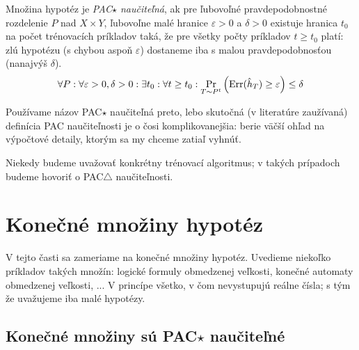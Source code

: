 \begin{definition}
  Množina hypotéz je \emph{PAC$\star$ naučiteľná}, ak pre ľubovoľné pravdepodobnostné
  rozdelenie $P$ nad $X \times Y$, ľubovoľne malé hranice $\varepsilon > 0$ a $\delta > 0$
  existuje hranica $t_0$ na počet trénovacích príkladov taká, že pre všetky
  počty príkladov $t \geq t_0$ platí: zlú hypotézu (s chybou
  aspoň $\varepsilon$) dostaneme iba s malou pravdepodobnosťou
  (nanajvýš $\delta$).
  $$ \forall P: \forall \varepsilon > 0, \delta > 0: \exists t_0: \forall t \geq t_0: \operatorname*{\mathrm{Pr}}_{T \sim P^t} \left( \mathrm{Err}(\hat{h}_T) \geq \varepsilon \right) \leq \delta $$
\end{definition}

Používame názov PAC$\star$ naučiteľná preto, lebo skutočná (v literatúre
zaužívaná) definícia PAC naučiteľnosti je o čosi komplikovanejšia: berie
väčší ohľad na výpočtové detaily, ktorým sa my chceme zatiaľ vyhnúť.

Niekedy budeme uvažovať konkrétny trénovací algoritmus; v takých prípadoch
budeme hovoriť o PAC$\triangle$ naučiteľnosti.





\section{Konečné množiny hypotéz}

V tejto časti sa zameriame na konečné množiny hypotéz. Uvedieme
niekoľko príkladov takých množín: logické formuly obmedzenej
veľkosti, konečné automaty obmedzenej veľkosti, ... V princípe
všetko, v čom nevystupujú reálne čísla; s tým že uvažujeme iba
malé hypotézy.



\subsection{Konečné množiny sú PAC$\star$ naučiteľné}


